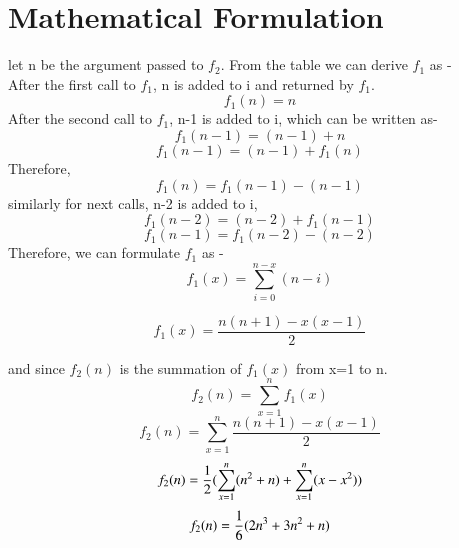 \documentclass[journal,12pt,twocolumn]{IEEEtran}
\begin{document}
\section{Mathematical Formulation}
let n be the argument passed to \begin{math}f_2\end{math}.
From the table we can derive $f_1$ as - \\
After the first call to \begin{math}f_1\end{math}, n is added to i and returned by \begin{math}f_1\end{math}.
\begin{equation}
f_1(n) = n 
\end{equation}
After the second call to \begin{math}f_1\end{math}, n-1 is added to i, which can be written as-
\begin{equation}
f_1(n-1) = (n-1) + n 
\end{equation}
\begin{equation}
f_1(n-1)= (n-1) + f_1(n) 
\end{equation}
Therefore,
\begin{equation}
f_1(n) = f_1(n-1) - (n-1) 
\end{equation}
similarly for next calls, n-2 is added to i,
\begin{equation}
f_1(n-2) = (n-2) + f_1(n-1) 
\end{equation}
\begin{equation}
f_1(n-1) = f_1(n-2) - (n-2)
\end{equation}
Therefore, we can formulate \begin{math}f_1\end{math} as -
\begin{equation}
f_1(x) = \sum_{i=0}^{n-x} (n-i)
\end{equation}

\begin{equation}
f_1(x) = \frac{n(n+1) - x(x-1)}{2}
\end{equation}

and since $f_2(n)$ is the summation of $f_1(x)$ from x=1 to n.\\
\begin{equation}
f_2(n) = \sum_{x=1}^{n} f_1(x)
\end{equation}
\begin{equation}
f_2(n) = \sum_{x=1}^{n}  \frac{n(n+1) - x(x-1)}{2}
\end{equation}
\begin{equation}
f_2(n) = \frac{1}{2} (\sum_{x=1}^{n} (n\textsuperscript{2} + n) + \sum_{x=1}^{n} (x - x\textsuperscript{2}) )
\end{equation}
\begin{equation}
f_2(n) = \frac{1}{6} (2n\textsuperscript{3} + 3n\textsuperscript{2} + n)
\end{equation}
\end{document}

